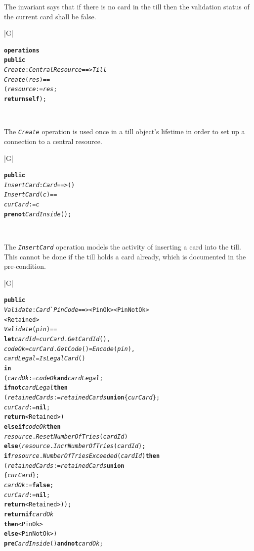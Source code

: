 \documentclass[\pformat,12pt,twoside]{article}
\newenvironment{VDMgray}%
{\begin{tabular}{|G|}\hline\small\begin{alltt}}%
{\end{alltt}\normalsize\\
 \hline\end{tabular}}
\begin{document}
The invariant says that if there is no card in the till then 
the validation status of the current card shall be false.

\begin{VDMgray}
\textbf{operations}
 \textbf{public}
 \textit{Create}: \textit{CentralResource} ==\texttt{>} \textit{Till}
 \textit{Create}(\textit{res}) ==
   (\textit{resource} := \textit{res};
    \textbf{return} \textbf{self});
\end{VDMgray}

The \texttt{\emph{Create}} operation is used once in a till object's lifetime 
in order to set up a connection to a central resource.

\begin{VDMgray}
 \textbf{public}
 \textit{InsertCard} : \textit{Card} ==\texttt{>} ()
 \textit{InsertCard}(\textit{c}) ==
   \textit{curCard} := \textit{c}
 \textbf{pre} \textbf{not} \textit{CardInside}();
\end{VDMgray}


The \texttt{\emph{InsertCard}} operation models the activity of inserting a card 
into the till. This cannot be done if the till holds a card already, 
which is documented in the pre-condition.

\begin{VDMgray}
 \textbf{public}
 \textit{Validate} : \textit{Card}\`{}\textit{PinCode} ==\texttt{>} \texttt{<}PinOk\texttt{>} {\textbar} \texttt{<}PinNotOk\texttt{>} 
                             {\textbar} \texttt{<}Retained\texttt{>}
 \textit{Validate}(\textit{pin}) ==
   \textbf{let} \textit{cardId} = \textit{curCard}.\textit{GetCardId}(),
       \textit{codeOk} = \textit{curCard}.\textit{GetCode}() = \textit{Encode}(\textit{pin}),
       \textit{cardLegal} = \textit{IsLegalCard}()
   \textbf{in}
     (\textit{cardOk} := \textit{codeOk} \textbf{and} \textit{cardLegal};
      \textbf{if} \textbf{not} \textit{cardLegal} \textbf{then}
          (\textit{retainedCards} := \textit{retainedCards} \textbf{union} \{\textit{curCard}\};
           \textit{curCard} := \textbf{nil};
           \textbf{return} \texttt{<}Retained\texttt{>})
      \textbf{elseif} \textit{codeOk} \textbf{then}
           \textit{resource}.\textit{ResetNumberOfTries}(\textit{cardId})
      \textbf{else} (\textit{resource}.\textit{IncrNumberOfTries}(\textit{cardId});
            \textbf{if} \textit{resource}.\textit{NumberOfTriesExceeded}(\textit{cardId}) \textbf{then}
              (\textit{retainedCards} := \textit{retainedCards} \textbf{union}
	                                 \{\textit{curCard}\};
               \textit{cardOk} := \textbf{false};
               \textit{curCard} := \textbf{nil};
               \textbf{return} \texttt{<}Retained\texttt{>}));
      \textbf{return} \textbf{if} \textit{cardOk}
             \textbf{then} \texttt{<}PinOk\texttt{>}
             \textbf{else} \texttt{<}PinNotOk\texttt{>})
 \textbf{pre} \textit{CardInside}() \textbf{and} \textbf{not} \textit{cardOk};
\end{VDMgray}
\end{document}
